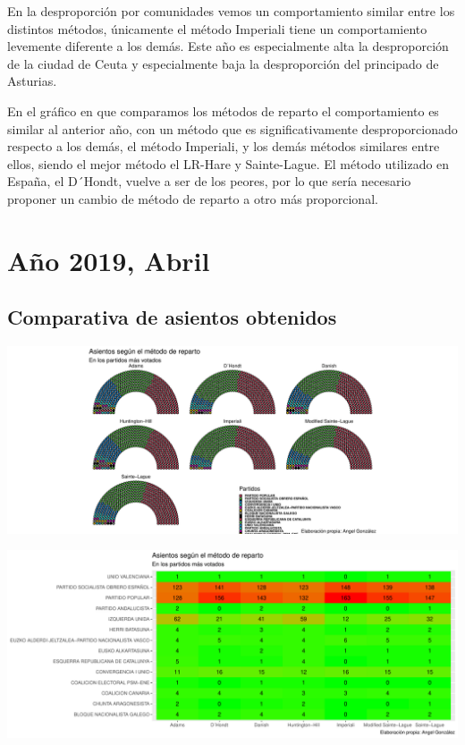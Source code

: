\documentclass[12pt,a4paper,]{book}
\numberwithin{dummy}{section}
\theoremstyle{ocrenumbox}
\theoremstyle{blacknumex}
\theoremstyle{blacknumbox}
\theoremstyle{ocrenum}
\theoremstyle{ocrenum}
\begin{document}
En la desproporción por comunidades vemos un comportamiento similar
entre los distintos métodos, únicamente el método Imperiali tiene un
comportamiento levemente diferente a los demás. Este año es
especialmente alta la desproporción de la ciudad de Ceuta y
especialmente baja la desproporción del principado de Asturias.

En el gráfico en que comparamos los métodos de reparto el comportamiento
es similar al anterior año, con un método que es significativamente
desproporcionado respecto a los demás, el método Imperiali, y los demás
métodos similares entre ellos, siendo el mejor método el LR-Hare y
Sainte-Lague. El método utilizado en España, el D´Hondt, vuelve a ser de
los peores, por lo que sería necesario proponer un cambio de método de
reparto a otro más proporcional.

\hypertarget{auxf1o-2019-abril}{%
\section{Año 2019, Abril}\label{auxf1o-2019-abril}}

\hypertarget{comparativa-de-asientos-obtenidos-13}{%
\subsection{Comparativa de asientos
obtenidos}\label{comparativa-de-asientos-obtenidos-13}}

\begin{center}\includegraphics[width=1\linewidth]{figurasR/unnamed-chunk-115-1} \end{center}

\begin{center}\includegraphics[width=1\linewidth]{figurasR/unnamed-chunk-115-2} \end{center}
\end{document}
